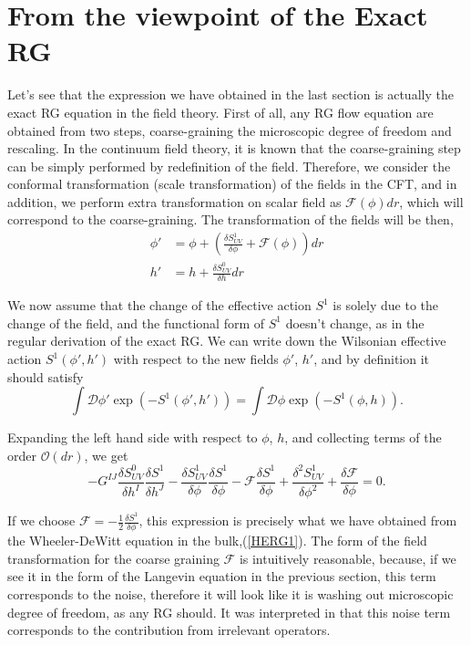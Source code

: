 \documentclass[12pt,epsbox]{article}
\numberwithin{equation}{section}
\begin{document}
\section{From the viewpoint of the Exact RG}

Let's see that the expression we have obtained in the last section is actually the exact RG equation in the field theory. First of all, any RG flow equation are obtained from two steps, coarse-graining the microscopic degree of freedom and rescaling. In the continuum field theory, it is known that the coarse-graining step can be simply performed by redefinition of the field\cite{Oliver}. Therefore, we consider the conformal transformation (scale transformation) of the fields in the CFT, and in addition, we perform extra transformation on scalar field as $\mathcal{F}(\phi) dr$, which will correspond to the coarse-graining. The transformation of the fields will be then,
\begin{equation}
\begin{split}
\phi'&= \phi+ \left( \frac{\delta S^1_{UV}}{\delta \phi} + \mathcal{F}(\phi) \right) dr\\
h'   &= h+ \frac{\delta S^0_{UV}}{\delta h}dr
\label{fieldtransf}
\end{split}
\end{equation}

We now assume that the change of the effective action $S^1$ is solely due to the change of the field, and the functional form of $S^1$ doesn't change, as in the regular derivation of the exact RG. We can write down the Wilsonian effective action $S^1(\phi', h')$ with respect to the new fields $\phi'$, $h'$, and by definition it should satisfy
\begin{equation}
\int \mathcal{D}\phi' \exp(-S^1(\phi', h'))=\int \mathcal{D}\phi \exp(-S^1(\phi, h)).
\end{equation}

Expanding the left hand side with respect to $\phi$, $h$, and collecting terms of the order $\mathcal{O}(dr)$, we get
\begin{equation}
- G^{IJ}\frac{\delta S^0_{UV}}{\delta h^I}\frac{\delta S^1}{\delta h^J}-\frac{\delta S^1_{UV}}{\delta \phi}\frac{\delta S^1}{\delta \phi}
-\mathcal{F}\frac{\delta S^1}{\delta \phi} + \frac{\delta^2 S^1_{UV}}{\delta \phi^2}+ \frac{\delta \mathcal{F}}{\delta \phi}=0.
\end{equation}

If we choose $\mathcal{F}= -\frac{1}{2} \frac{ \delta S^1 }{ \delta \phi} $, this expression is precisely what we have obtained from the Wheeler-DeWitt equation in the bulk,(\ref{HERG1}). The form of the field transformation for the coarse graining $\mathcal{F}$ is intuitively reasonable, because, if we see it in the form of the Langevin equation in the previous section, this term corresponds to the noise, therefore it will look like it is washing out microscopic degree of freedom, as any RG should. It was interpreted in \cite{Gaite} that this noise term corresponds to the contribution from irrelevant operators.
\end{document}
